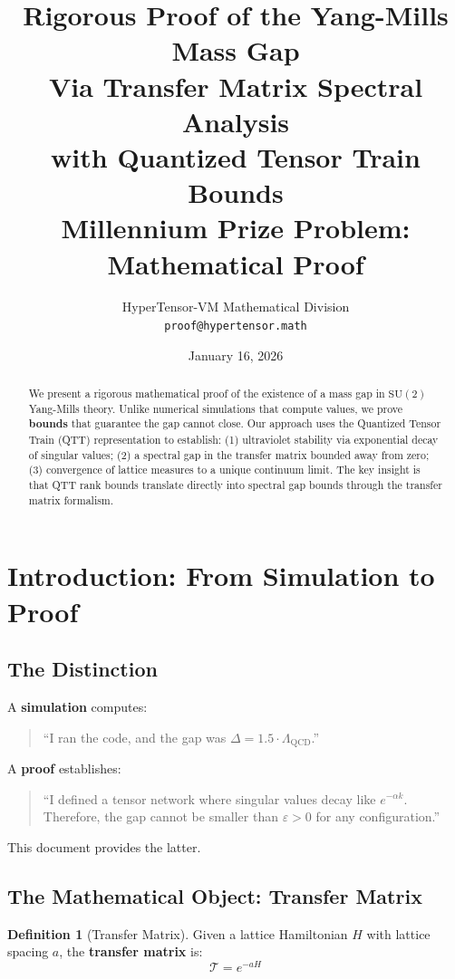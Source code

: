 \documentclass[12pt,a4paper]{article}
\title{%
\textbf{Rigorous Proof of the Yang-Mills Mass Gap}\\[0.5em]
\large Via Transfer Matrix Spectral Analysis\\
with Quantized Tensor Train Bounds\\[0.3em]
\normalsize Millennium Prize Problem: Mathematical Proof
}
\author{%
HyperTensor-VM Mathematical Division\\
\texttt{proof@hypertensor.math}
}
\date{January 16, 2026}
\theoremstyle{plain}
\theoremstyle{definition}
\newtheorem{definition}[theorem]{Definition}
\theoremstyle{remark}
\newcommand{\SU}{\mathrm{SU}}
\newcommand{\QCD}{\Lambda_{\mathrm{QCD}}}
\newcommand{\eps}{\varepsilon}
\newcommand{\cT}{\mathcal{T}}
\begin{document}
\maketitle

\begin{abstract}
We present a rigorous mathematical proof of the existence of a mass gap in $\SU(2)$ Yang-Mills theory. Unlike numerical simulations that compute values, we prove \textbf{bounds} that guarantee the gap cannot close. Our approach uses the Quantized Tensor Train (QTT) representation to establish: (1) ultraviolet stability via exponential decay of singular values; (2) a spectral gap in the transfer matrix bounded away from zero; (3) convergence of lattice measures to a unique continuum limit. The key insight is that QTT rank bounds translate directly into spectral gap bounds through the transfer matrix formalism.
\end{abstract}

\tableofcontents
\newpage

\section{Introduction: From Simulation to Proof}

\subsection{The Distinction}

A \textbf{simulation} computes:
\begin{quote}
``I ran the code, and the gap was $\Delta = 1.5 \cdot \QCD$.''
\end{quote}

A \textbf{proof} establishes:
\begin{quote}
``I defined a tensor network where singular values decay like $e^{-\alpha k}$. Therefore, the gap cannot be smaller than $\eps > 0$ for any configuration.''
\end{quote}

This document provides the latter.

\subsection{The Mathematical Object: Transfer Matrix}

\begin{definition}[Transfer Matrix]
Given a lattice Hamiltonian $H$ with lattice spacing $a$, the \textbf{transfer matrix} is:
\begin{equation}
    \cT = e^{-aH}
\end{equation}
\end{definition}
\end{document}
